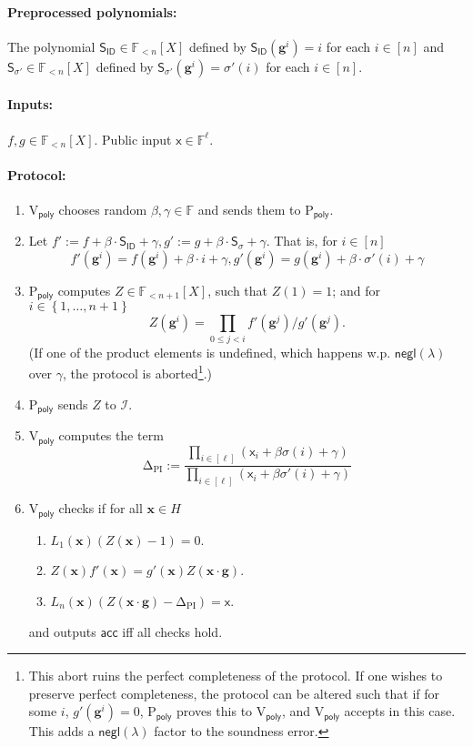 \documentclass[11pt]{article} %
\newcommand{\x}{\ensuremath{\mathbf{x}}\xspace}
\newcommand{\F}{\ensuremath{\mathbb F}\xspace}
\newcommand{\pubinputdelta}{\ensuremath{\mathrm{\Delta_{\mathrm{PI}}}}\xspace}
\newcommand{\negl}{\ensuremath{\mathsf{negl}(\lambda)}\xspace}
\newcommand{\acc}{\ensuremath{\mathsf{acc}}\xspace}
\newcommand{\defeq}{:=}
\newcommand{\dom}{\ensuremath{H}\xspace}
\newcommand{\prvpoly}{\ensuremath{\mathrm{P_{\mathsf{poly}}}}\xspace}
\newcommand{\verpoly}{\ensuremath{\mathrm{V_{\mathsf{poly}}}}\xspace}
\newcommand{\ideal}{\ensuremath{\mathcal{I}}\xspace}
\newcommand{\inp}{\ensuremath{\mathsf{x}}\xspace}
\newcommand{\set}[1]{\ensuremath{\left\{#1\right\}}\xspace}
\newcommand{\hgen}{\ensuremath{\mathbf{g}}\xspace}
\newcommand{\polysofdeg}[1]{\ensuremath{\F_{< #1}[X]}\xspace}
\newcommand{\sig}{\ensuremath{\sigma}\xspace}
\newcommand{\sigpoly}{\ensuremath{\mathsf{S_{\sigma}}}\xspace}
\newcommand{\sigprimepoly}{\ensuremath{\mathsf{S_{\sigma'}}}\xspace}
\newcommand{\idpoly}{\ensuremath{\mathsf{S_{ID}}}\xspace}
\begin{document}
\paragraph{Preprocessed polynomials:}
The polynomial $\idpoly\in \polysofdeg{n}$ defined by 
$\idpoly(\hgen^{i}) = i$ for each $i\in [n]$ and $\sigprimepoly \in \polysofdeg{n}$ defined by
$\sigprimepoly(\hgen^{i}) = \sig'(i)$ for each $i\in [n]$.
\paragraph{Inputs:}
$f,g\in \polysofdeg{n}$. Public input $\inp\in \F^\ell$.
\paragraph{Protocol:}
\begin{enumerate}
 \item\label{item:betgamma} \verpoly chooses random $\beta,\gamma \in\F$ and sends them to \prvpoly.
 \item Let $f'\defeq f+\beta\cdot  \idpoly +\gamma, g'\defeq g+\beta\cdot \sigpoly + \gamma$.
That is, for $i\in [n]$
 \[f'(\hgen^i) = f(\hgen^i) + \beta\cdot i + \gamma,
 g'(\hgen^i) = g(\hgen^i) + \beta\cdot \sigma'(i) + \gamma\]
 \item \prvpoly computes $Z \in \polysofdeg{n+1}$, such that 
 $Z(1) = 1$; and for $i\in \set{1,\ldots,n+1}$
 \[Z(\hgen^i)  = \prod_{0\leq j <i} f'(\hgen^j)/g'(\hgen^j).\]
 (If one of the product elements is undefined, which happens w.p. \negl over $\gamma$, the protocol is aborted\footnote{This abort ruins the perfect completeness of the protocol. If one wishes to preserve perfect completeness, the protocol can be altered such that if for some $i$, $g'(\hgen^i)=0$, \prvpoly proves this to \verpoly, and \verpoly accepts in this case. This adds a \negl factor to the soundness error.}.)
 \item \prvpoly sends $Z$ to \ideal.
 \item \verpoly computes the term 
 \[\pubinputdelta\defeq \frac{\prod_{i\in [\ell]}(\inp_i +\beta\sigma(i) + \gamma)} {\prod_{i\in [\ell]} (\inp_i + \beta \sigma'(i) + \gamma)}\]
 \item \verpoly checks if for all $\x\in \dom$
 \begin{enumerate}
  \item $L_1(\x) (Z(\x)-1) = 0$.
  \item $Z(\x)f'(\x) = g'(\x)Z(\x\cdot \hgen)$.
\item $L_n(\x)(Z(\x\cdot \hgen)-\pubinputdelta) = \inp$.
  \end{enumerate}
and outputs \acc iff all checks hold.
\end{enumerate}
\end{document}
